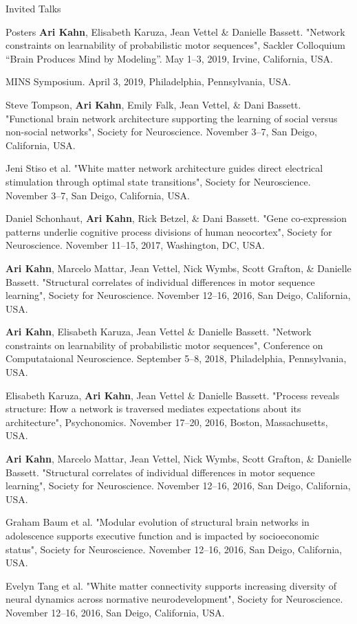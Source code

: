 \documentclass{resume} %
\begin{document}
\begin{rSection}{Invited Talks}
\begin{rSection}{Posters}
\textbf{Ari Kahn}, Elisabeth Karuza, Jean Vettel \& Danielle Bassett. "Network constraints on learnability of probabilistic motor sequences", Sackler Colloquium ``Brain Produces Mind by Modeling''. May 1--3, 2019, Irvine, California, USA.

MINS Symposium. April 3, 2019, Philadelphia, Pennsylvania, USA.

Steve Tompson, \textbf{Ari Kahn}, Emily Falk, Jean Vettel, \& Dani Bassett. "Functional brain network architecture supporting the learning of social versus non-social networks", Society for Neuroscience. November 3--7, San Deigo, California, USA.

Jeni Stiso et al. "White matter network architecture guides direct electrical stimulation through optimal state transitions", Society for Neuroscience. November 3--7, San Deigo, California, USA.

Daniel Schonhaut, \textbf{Ari Kahn}, Rick Betzel, \& Dani Bassett. "Gene co-expression patterns underlie cognitive process divisions of human neocortex", Society for Neuroscience. November 11--15, 2017, Washington, DC, USA.

\textbf{Ari Kahn}, Marcelo Mattar, Jean Vettel, Nick Wymbs, Scott Grafton, \& Danielle Bassett. "Structural correlates of individual differences in motor sequence learning", Society for Neuroscience. November 12--16, 2016, San Deigo, California, USA.

\textbf{Ari Kahn}, Elisabeth Karuza, Jean Vettel \& Danielle Bassett. "Network constraints on learnability of probabilistic motor sequences", Conference on Computataional Neuroscience. September 5--8, 2018, Philadelphia, Pennsylvania, USA.

Elisabeth Karuza, \textbf{Ari Kahn}, Jean Vettel \& Danielle Bassett. "Process reveals structure: How a network is traversed mediates expectations about its architecture", Psychonomics. November 17--20, 2016, Boston, Massachusetts, USA.

\textbf{Ari Kahn}, Marcelo Mattar, Jean Vettel, Nick Wymbs, Scott Grafton, \& Danielle Bassett. "Structural correlates of individual differences in motor sequence learning", Society for Neuroscience. November 12--16, 2016, San Deigo, California, USA.

Graham Baum et al. "Modular evolution of structural brain networks in adolescence supports executive function and is impacted by socioeconomic status", Society for Neuroscience. November 12--16, 2016, San Deigo, California, USA.

Evelyn Tang et al. "White matter connectivity supports increasing diversity of neural dynamics across normative neurodevelopment", Society for Neuroscience. November 12--16, 2016, San Deigo, California, USA.


\end{rSection}
\end{rSection}
\end{document}
